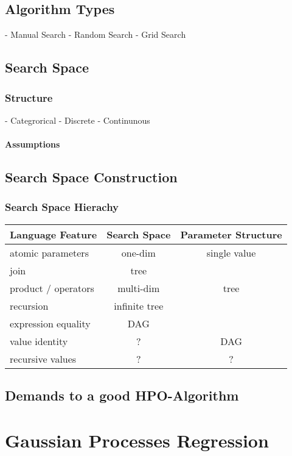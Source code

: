\documentclass[english]{article}
\begin{document}
\subsection{Algorithm Types}
 - Manual Search
 - Random Search
 - Grid Search
\subsection{Search Space}
\subsubsection{Structure}
 - Categrorical
 - Discrete
 - Continunous
\paragraph{Assumptions}
\subsection{Search Space Construction}
\subsubsection{Search Space Hierachy}


\begin{tabular}{ l | c | c }
Language Feature & Search Space & Parameter Structure \\
\hline
atomic parameters   & one-dim          & single value \\
join                & tree             &              \\
product / operators & multi-dim        & tree         \\
recursion           & infinite tree    &              \\
expression equality & DAG              &              \\
value identity      & ?                & DAG          \\
recursive values    & ?                & ? 
\end{tabular}

\subsection{Demands to a good HPO-Algorithm}

\section{Gaussian Processes Regression}
\end{document}
